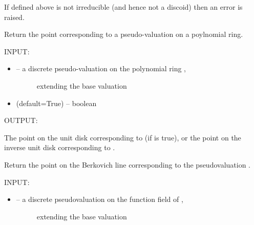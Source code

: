 \documentclass[letterpaper,10pt,english]{sphinxmanual}
\begin{document}
\begin{fulllineitems}
\begin{fulllineitems}
If  defined above is not irreducible (and hence not a discoid) then
an error is raised.

\end{fulllineitems}


\begin{fulllineitems}
\label{berkovich_line:mclf.berkovich.berkovich_line.BerkovichLine.point_from_polynomial_pseudovaluation}
Return the point corresponding to a pseudo-valuation on a poylnomial ring.

INPUT:
\begin{itemize}
\item {} \begin{description}
\item[{ -- a discrete pseudo-valuation on the polynomial ring ,}] \leavevmode
extending the base valuation 

\end{description}

\item {} 
 (default=True) -- boolean

\end{itemize}

OUTPUT:

The point on the unit disk corresponding to  (if 
is true), or the point on the inverse unit disk corresponding to .

\end{fulllineitems}


\begin{fulllineitems}
\label{berkovich_line:mclf.berkovich.berkovich_line.BerkovichLine.point_from_pseudovaluation}
Return the point on the Berkovich line corresponding to the pseudovaluation .

INPUT:
\begin{itemize}
\item {} \begin{description}
\item[{ -- a discrete pseudovaluation on the function field of ,}] \leavevmode
extending the base valuation 


\end{description}
\end{itemize}
\end{fulllineitems}
\end{fulllineitems}
\end{document}
